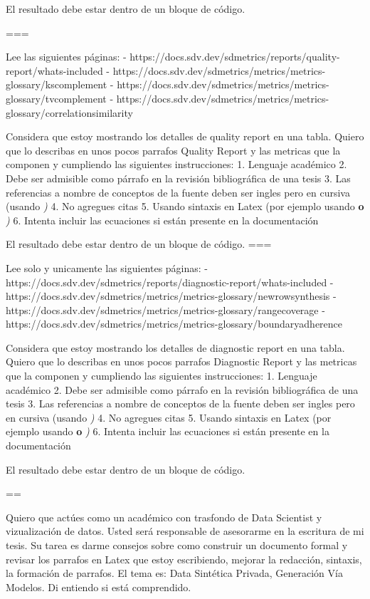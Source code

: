 El resultado debe estar dentro de un bloque de código.

===

Lee las siguientes páginas:
- https://docs.sdv.dev/sdmetrics/reports/quality-report/whats-included
- https://docs.sdv.dev/sdmetrics/metrics/metrics-glossary/kscomplement
- https://docs.sdv.dev/sdmetrics/metrics/metrics-glossary/tvcomplement
- https://docs.sdv.dev/sdmetrics/metrics/metrics-glossary/correlationsimilarity

Considera que estoy mostrando los detalles de quality report en una tabla.
Quiero que lo describas en unos pocos parrafos Quality Report y las metricas que la componen y cumpliendo las siguientes instrucciones:
1. Lenguaje  académico
2. Debe ser admisible como párrafo en la revisión bibliográfica de una tesis
3. Las referencias a nombre de conceptos de la fuente deben ser ingles pero en cursiva (usando \emph)
4. No agregues citas
5. Usando sintaxis en Latex (por ejemplo usando \textbf o \emph)
6. Intenta incluir las ecuaciones si están presente en la documentación

El resultado debe estar dentro de un bloque de código.
===

Lee solo y unicamente las siguientes páginas:
- https://docs.sdv.dev/sdmetrics/reports/diagnostic-report/whats-included
- https://docs.sdv.dev/sdmetrics/metrics/metrics-glossary/newrowsynthesis
- https://docs.sdv.dev/sdmetrics/metrics/metrics-glossary/rangecoverage
- https://docs.sdv.dev/sdmetrics/metrics/metrics-glossary/boundaryadherence

Considera que estoy mostrando los detalles de diagnostic report en una tabla.
Quiero que lo describas en unos pocos parrafos Diagnostic Report y las metricas que la componen y cumpliendo las siguientes instrucciones:
1. Lenguaje  académico
2. Debe ser admisible como párrafo en la revisión bibliográfica de una tesis
3. Las referencias a nombre de conceptos de la fuente deben ser ingles pero en cursiva (usando \emph)
4. No agregues citas
5. Usando sintaxis en Latex (por ejemplo usando \textbf o \emph)
6. Intenta incluir las ecuaciones si están presente en la documentación

El resultado debe estar dentro de un bloque de código.

==


Quiero que actúes como un académico con trasfondo de Data Scientist y vizualización de datos. Usted será responsable de asesorarme en la escritura de mi tesis. Su tarea es darme consejos sobre como construir un documento formal y revisar los parrafos en Latex que estoy escribiendo, mejorar la redacción, sintaxis, la formación de parrafos. El tema es: Data Sintética Privada, Generación Vía Modelos. Di entiendo si está comprendido.




